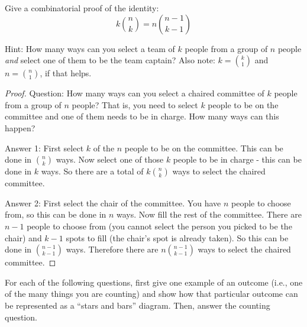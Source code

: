 \begin{questions}
 \question[6] Give a combinatorial proof of the identity:
 \[k{n\choose k} = n{n-1 \choose k-1}\]

 Hint: How many ways can you select a team of $k$ people from a group of $n$ people \emph{and} select one of them to be the team captain?  Also note: $k = \binom{k}{1}$ and $n = \binom{n}{1}$, if that helps.
   \begin{solution}
     \begin{proof}
       Question: How many ways can you select a chaired committee of $k$ people from a group of $n$ people?  That is, you need to select $k$ people to be on the committee and one of them needs to be in charge.  How many ways can this happen?

       Answer 1: First select $k$ of the $n$ people to be on the committee.  This can be done in ${n \choose k}$ ways.  Now select one of those $k$ people to be in charge - this can be done in $k$ ways.  So there are a total of $k {n \choose k}$ ways to select the chaired committee.

       Answer 2: First select the chair of the committee.  You have $n$ people to choose from, so this can be done in $n$ ways.  Now fill the rest of the committee.  There are $n-1$ people to choose from (you cannot select the person you picked to be the chair) and $k-1$ spots to fill (the chair's spot is already taken).  So this can be done in ${n-1 \choose k-1}$ ways.  Therefore there are $n{n-1 \choose k-1}$ ways to select the chaired committee.
     \end{proof}

   \end{solution}



 	\question[6] For each of the following questions, first give one example of an outcome (i.e., one of the many things you are counting) and show how that particular outcome can be represented as a ``stars and bars'' diagram.  Then, answer the counting question.
\end{questions}
